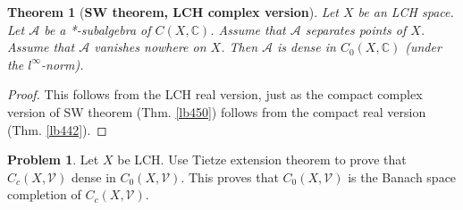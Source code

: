 \documentclass[12pt,b5paper,notitlepage]{article}
\theoremstyle{definition}
\newtheorem{prob}{\color{red}Problem}[section]
\theoremstyle{plain}
\newtheorem{thm}[df]{Theorem}
\newcommand{\mc}{\mathcal}
\newcommand{\scr}{\mathscr}
\newcommand{\Cbb}{\mathbb C}
\numberwithin{equation}{section}
\begin{document}
\begin{thm}[\textbf{SW theorem, LCH complex version}]
Let $X$ be an LCH space. Let $\scr A$ be a *-subalgebra of $C(X,\Cbb)$. Assume that $\scr A$ separates points of $X$. Assume that $\scr A$ vanishes nowhere on $X$. Then $\scr A$ is dense in $C_0(X,\Cbb)$ (under the $l^\infty$-norm).
\end{thm}


\begin{proof}
This follows from the LCH real version, just as the compact complex version of SW theorem (Thm. \ref{lb450}) follows from the compact real version (Thm. \ref{lb442}).
\end{proof}





\begin{prob}
Let $X$ be LCH. Use Tietze extension theorem to prove that $C_c(X,\mc V)$ dense in $C_0(X,\mc V)$. This proves that $C_0(X,\mc V)$ is the Banach space completion of $C_c(X,\mc V)$.
\end{prob}































\newpage

\printindex	
\end{document}
